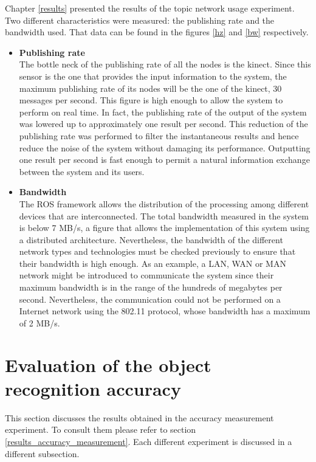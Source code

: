 			Chapter \ref{results} presented the results of the topic network usage experiment. 
			Two different characteristics were measured: the publishing rate and the bandwidth used. 
			That data can be found in the figures \ref{hz} and \ref{bw} respectively. 
			\\

			\begin{itemize}
				\item{\textbf{Publishing rate}}\\

				The bottle neck of the publishing rate of all the nodes is the kinect. 
				Since this sensor is the one that provides the input information to the system, the maximum publishing rate of its nodes will be the one of the kinect, 30 messages per second.
				This figure is high enough to allow the system to perform on real time. 
				In fact, the publishing rate of the output of the system was lowered up to approximately one result per second.
				This reduction of the publishing rate was performed to filter the instantaneous results and hence reduce the noise of the system without damaging its performance.
				Outputting one result per second is fast enough to permit a natural information exchange between the system and its users.

			\item{\textbf{Bandwidth}}\\

				The ROS framework allows the distribution of the processing among different devices that are interconnected. 
				The total bandwidth measured in the system is below 7 MB/s, a figure that allows the implementation of this system using a distributed architecture. 
				Nevertheless, the bandwidth of the different network types and technologies must be checked previously to ensure that their bandwidth is high enough. 
				As an example, a LAN, WAN or MAN network might be introduced to communicate the system since their maximum bandwidth is in the range of the hundreds of megabytes per second. 
				Nevertheless, the communication could not be performed on a Internet network using the 802.11 protocol, whose bandwidth has a maximum of 2 MB/s.


		\end{itemize}

\section{Evaluation of the object recognition accuracy}
\label{discussion_accuracy}
	This section discusses the results obtained in the accuracy measurement experiment. 
	To consult them please refer to section \ref{results_accuracy_measurement}.
	Each different experiment is discussed in a different subsection.


